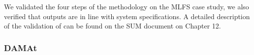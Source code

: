 We validated the four steps of the methodology on the MLFS case study, we also verified that outputs are in line with system specifications. A detailed description of the validation of \SEMUS can be found on the SUM document on Chapter 12.


\subsubsection{DAMAt}

\clearpage
